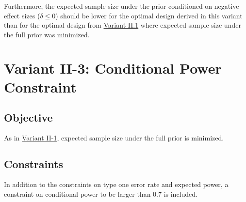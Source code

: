 \documentclass[
]{book}
\newenvironment{Shaded}{\begin{snugshade}}{\end{snugshade}}
\newcommand{\DecValTok}[1]{\textcolor[rgb]{0.00,0.00,0.81}{#1}}
\newcommand{\KeywordTok}[1]{\textcolor[rgb]{0.13,0.29,0.53}{\textbf{#1}}}
\newcommand{\NormalTok}[1]{#1}
\newcommand{\OperatorTok}[1]{\textcolor[rgb]{0.81,0.36,0.00}{\textbf{#1}}}
\newcommand{\StringTok}[1]{\textcolor[rgb]{0.31,0.60,0.02}{#1}}
\begin{document}
Furthermore, the expected sample size under the prior conditioned on negative
effect sizes (\(\delta \leq 0\)) should be lower for the optimal design derived
in this variant than for the optimal design from \protect\hyperlink{variantII_1}{Variant II.1}
where expected sample size under the full prior was minimized.

\begin{Shaded}
\end{Shaded}

\hypertarget{variantII_3}{%
\section{Variant II-3: Conditional Power Constraint}\label{variantII_3}}

\hypertarget{objective-5}{%
\subsection{Objective}\label{objective-5}}

As in \protect\hyperlink{variantII_1}{Variant II-1}, expected sample size under the full prior
is minimized.

\hypertarget{constraints-5}{%
\subsection{Constraints}\label{constraints-5}}

In addition to the constraints on type one error rate and expected power,
a constraint on conditional power to be larger than \(0.7\) is included.
\end{document}
